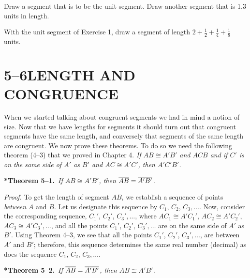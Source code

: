 \documentclass[11pt]{book}
\begin{document}

\begin{exercisecols}
\begin{exlist}
\item Draw a segment that is to be the unit segment. Draw another segment that
      is 1.3 units in length.
\item With the unit segment of Exercise 1, draw a segment of length
      $2 + \frac{1}{2} + \frac{1}{4} + \frac{1}{8}$ units.
\end{exlist}
\end{exercisecols}

\section*{5--6\quad LENGTH AND CONGRUENCE}

When we started talking about congruent segments we had in mind a notion of
size. Now that we have lengths for segments it should turn out that congruent
segments have the same length, and conversely that segments of the same length
are congruent. We now prove these theorems. To do so we need the following
theorem (4--3) that we proved in Chapter 4. \emph{If $AB \cong A'B'$ and $ACB$
and if $C'$ is on the same side of $A'$ as $B'$ and $AC \cong A'C'$, then
$A'C'B'$.}

\medskip\noindent
\textbf{*Theorem 5--1.}\ \emph{If $AB \cong A'B'$, then
$\overline{AB} = \overline{A'B'}$.}
\par\medskip

\noindent\emph{Proof.} To get the length of segment $AB$, we establish a
sequence of points \emph{between} $A$ and $B$. Let us designate this sequence
by $C_1$, $C_2$, $C_3,\ldots$. Now, consider the corresponding sequence,
$C_1'$, $C_2'$, $C_3',\ldots$, where $AC_1 \cong A'C_1'$,
$AC_2 \cong A'C_2'$, $AC_3 \cong A'C_3',\ldots$, and all the points $C_1'$,
$C_2'$, $C_3',\ldots$ are on the same side of $A'$ as $B'$. Using Theorem
4--3, we see that all the points $C_1'$, $C_2'$, $C_3',\ldots$, are between
$A'$ and $B'$; therefore, this sequence determines the same real number
(decimal) as does the sequence $C_1$, $C_2$, $C_3,\ldots$.

\medskip\noindent
\textbf{*Theorem 5--2.}\ \emph{If $\overline{AB} = \overline{A'B'}$, then
$AB \cong A'B'$.}
\par\medskip
\end{document}
